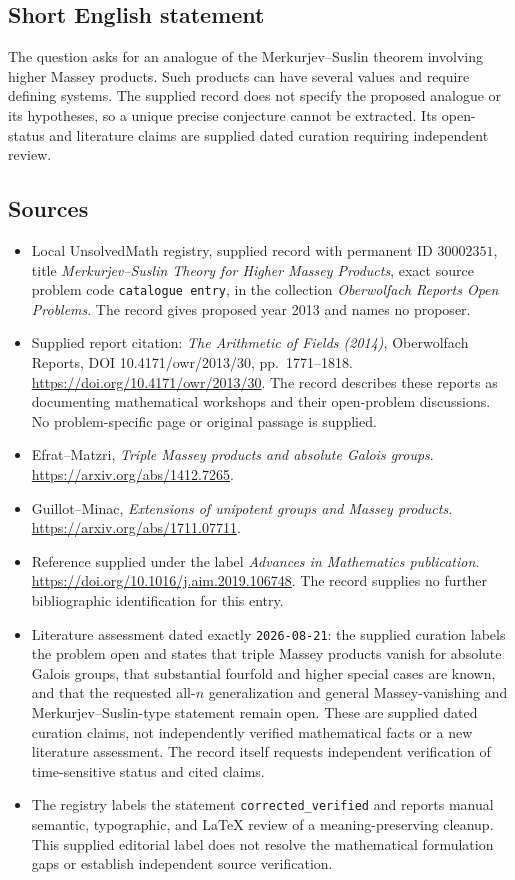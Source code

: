 \documentclass[11pt]{article}
\begin{document}
\subsection{Short English statement}
The question asks for an analogue of the Merkurjev--Suslin theorem involving higher Massey products. Such products can have several values and require defining systems. The supplied record does not specify the proposed analogue or its hypotheses, so a unique precise conjecture cannot be extracted. Its open-status and literature claims are supplied dated curation requiring independent review.
\subsection{Sources}
\begin{itemize}
\item Local UnsolvedMath registry, supplied record with permanent ID \(30002351\), title \emph{Merkurjev--Suslin Theory for Higher Massey Products}, exact source problem code \texttt{catalogue entry}, in the collection \emph{Oberwolfach Reports Open Problems}. The record gives proposed year 2013 and names no proposer.
\item Supplied report citation: \emph{The Arithmetic of Fields (2014)}, Oberwolfach Reports, DOI 10.4171/owr/2013/30, pp.~1771--1818. \url{https://doi.org/10.4171/owr/2013/30}. The record describes these reports as documenting mathematical workshops and their open-problem discussions. No problem-specific page or original passage is supplied.
\item Efrat--Matzri, \emph{Triple Massey products and absolute Galois groups}. \url{https://arxiv.org/abs/1412.7265}.
\item Guillot--Minac, \emph{Extensions of unipotent groups and Massey products}. \url{https://arxiv.org/abs/1711.07711}.
\item Reference supplied under the label \emph{Advances in Mathematics publication}. \url{https://doi.org/10.1016/j.aim.2019.106748}. The record supplies no further bibliographic identification for this entry.
\item Literature assessment dated exactly \texttt{2026-08-21}: the supplied curation labels the problem open and states that triple Massey products vanish for absolute Galois groups, that substantial fourfold and higher special cases are known, and that the requested all-\(n\) generalization and general Massey-vanishing and Merkurjev--Suslin-type statement remain open. These are supplied dated curation claims, not independently verified mathematical facts or a new literature assessment. The record itself requests independent verification of time-sensitive status and cited claims.
\item The registry labels the statement \texttt{corrected\_verified} and reports manual semantic, typographic, and LaTeX review of a meaning-preserving cleanup. This supplied editorial label does not resolve the mathematical formulation gaps or establish independent source verification.
\end{itemize}
\end{document}
